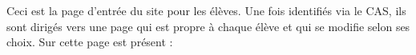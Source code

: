 Ceci est la page d'entrée du site pour les élèves. Une fois identifiés via le CAS, ils sont dirigés vers une page qui est propre à chaque élève et qui se modifie selon ses choix.
Sur cette page est présent :
